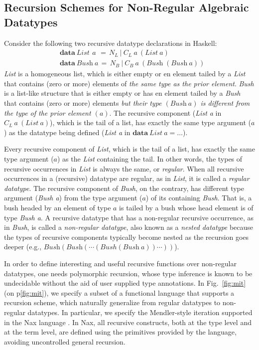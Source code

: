 \documentclass[runningheads,a4paper]{llncs}
\begin{document}

\subsection{Recursion Schemes for Non-Regular Algebraic Datatypes}
\label{ssec:mit}
Consider the following two recursive datatype declarations in Haskell:
\begin{align*}
& \textbf{data}~\textit{List}~\,a~
      \,=\, N_{\!L}
       ~|~  C_{\!L}~a~(\textit{List}~a)\\
& \textbf{data}~\textit{Bush}~a
      \,=\, N_{\!B}
       ~|~  C_{\!B}~a~(\textit{Bush}\;(\textit{Bush}~a))
\end{align*}
\textit{List} is a homogeneous list, which is either empty
or en element tailed by a \textit{List} that contains (zero or more)
elements of \emph{the same type as the prior element}.
\textit{Bush} is a list-like structure that is either empty
or has en element tailed by a \textit{Bush} that contains (zero or more) 
elements \emph{but their type $(\textit{Bush}~a)$ is different from 
the type of the prior element $(a)$}.
The recursive component (\textit{List a} in $C_{\!L}~a~(\textit{List}~a)$),
which is the tail of a list, has exactly the same type argument ($a$) as
the datatype being defined
(\textit{List a} in $\textbf{data}~\textit{List}~a = \ldots$).

Every recursive component of \textit{List}, which is the tail of a list,
has exactly the same type argument ($a$) as the \textit{List} containing
the tail. In other words, the types of recursive occurrences in \textit{List}
is always the same, or \emph{regular}. When all recursive occurrences in
a (recursive) datatype are regular, as in \emph{List}, it is called
a \emph{regular datatype}. The recursive component of \textit{Bush},
on the contrary, has different type argument (\textit{Bush a}) from
the type argument ($a$) of its containing \textit{Bush}. That is,
a bush headed by an element of type $a$ is tailed by a bush whose
head element is of type \emph{Bush a}. A recursive datatype that
has a non-regular recursive occurrence, as in \emph{Bush}, is called
a \emph{non-regular datatype}, also known as
a \emph{nested datatype}\;\cite{BirMee98} because the types of
recursive components typically become nested as the recursion goes deeper
(e.g., $\textit{Bush}(\textit{Bush}(\cdots(Bush(\textit{Bush}~a))\cdots))$).

In order to define interesting and useful recursive functions over
non-regular datatypes, one needs polymorphic recursion, whose 
type inference is known to be undecidable without the aid of
user supplied type annotations. In Fig.~\ref{fig:mit} (on p\ref{fig:mit}),
we specify a subset of a functional language that supports a recursion scheme,
which naturally generalize from regular datatypes to non-regular datatypes.
In particular, we specify
the Mendler-style iteration \cite{matthes98phd,AbeMatUus03}
supported in the Nax language \cite{Ahn14thesis}. In Nax,
all recursive constructs, both at the type level and at the term level,
are defined using the primitives provided by the language, avoiding
uncontrolled general recursion.
\end{document}
